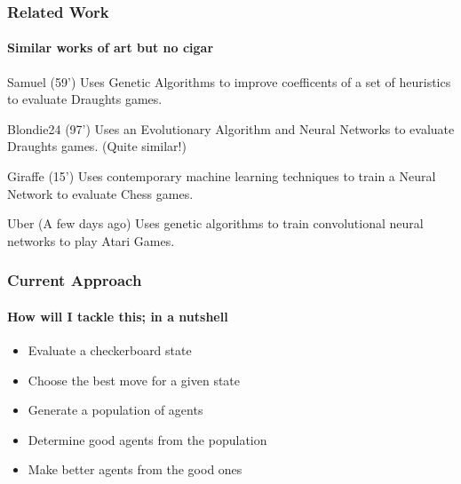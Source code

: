 \documentclass[aspectratio=169]{beamer}
\begin{document}
\begin{frame}
	\frametitle{Related Work}
	\framesubtitle{Similar works of art but no cigar}
	\begin{block}{Samuel (59')}
		Uses Genetic Algorithms to improve coefficents of a set of heuristics to evaluate Draughts games. \cite{samuel_studies_2000}
	\end{block}
	\begin{block}{Blondie24 (97')}
		Uses an Evolutionary Algorithm and Neural Networks to evaluate Draughts games. (Quite similar!) \cite{chellapilla_evolving_1999}
	\end{block}

	 \begin{block}{Giraffe (15')}
		Uses contemporary machine learning techniques to train a Neural Network to evaluate Chess games. \cite{lai_giraffe:_2015}
	 \end{block}

	 \begin{block}{Uber (A few days ago)}
		Uses genetic algorithms to train convolutional neural networks to play Atari Games. \cite{lai_giraffe:_2015}
	 \end{block}
\end{frame}

\begin{frame}
	\frametitle{Current Approach}
	\framesubtitle{How will I tackle this; in a nutshell}
	\begin{itemize}
		\item Evaluate a checkerboard state
		\item Choose the best move for a given state
		\item Generate a population of agents
		\item Determine good agents from the population
		\item Make better agents from the good ones
	\end{itemize}

\end{frame}
\end{document}
